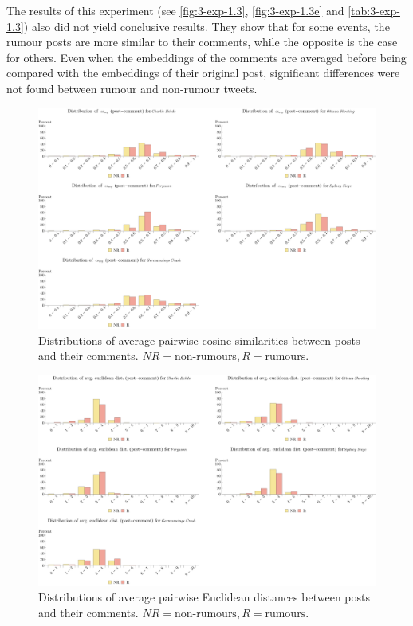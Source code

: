 The results of this experiment (see \autoref{fig:3-exp-1.3}, \autoref{fig:3-exp-1.3e} and \autoref{tab:3-exp-1.3}) also did not yield conclusive results. They show that for some events, the rumour posts are more similar to their comments, while the opposite is the case for others. Even when the embeddings of the comments are averaged before being compared with the embeddings of their original post, significant differences were not found between rumour and non-rumour tweets.

\begin{figure}[h]
  \myfloatalign
  \includegraphics[width={\textwidth + \marginparsep + \marginparwidth}]{gfx/Experiment_1_3}
  \caption{Distributions of average pairwise cosine similarities between posts and their comments. $NR=\textrm{non-rumours}, R=\textrm{rumours}$.}
  \label{fig:3-exp-1.3}
\end{figure}

\begin{figure}[h]
  \myfloatalign
  \includegraphics[width={\textwidth + \marginparsep + \marginparwidth}]{gfx/Experiment_1_3_eucl}
  \caption{Distributions of average pairwise Euclidean distances between posts and their comments. $NR=\textrm{non-rumours}, R=\textrm{rumours}$.}
  \label{fig:3-exp-1.3e}
\end{figure}

